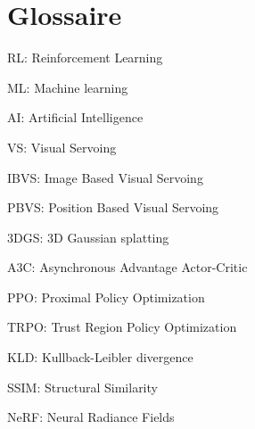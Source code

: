 \newpage
\section*{Glossaire}

RL: Reinforcement Learning 

\vspace{0.5cm}
ML: Machine learning 

\vspace{0.5cm}
AI: Artificial Intelligence

\vspace{0.5cm}
VS: Visual Servoing

\vspace{0.5cm}
IBVS: Image Based Visual Servoing 

\vspace{0.5cm}
PBVS: Position Based Visual Servoing 

\vspace{0.5cm}
3DGS: 3D Gaussian splatting

\vspace{0.5cm}
A3C:  Asynchronous Advantage Actor-Critic

\vspace{0.5cm}
PPO:  Proximal Policy Optimization

\vspace{0.5cm}
TRPO:  Trust Region Policy Optimization

\vspace{0.5cm}
KLD:   Kullback-Leibler divergence

\vspace{0.5cm}
SSIM: Structural Similarity

\vspace{0.5cm}
NeRF:  Neural Radiance Fields 